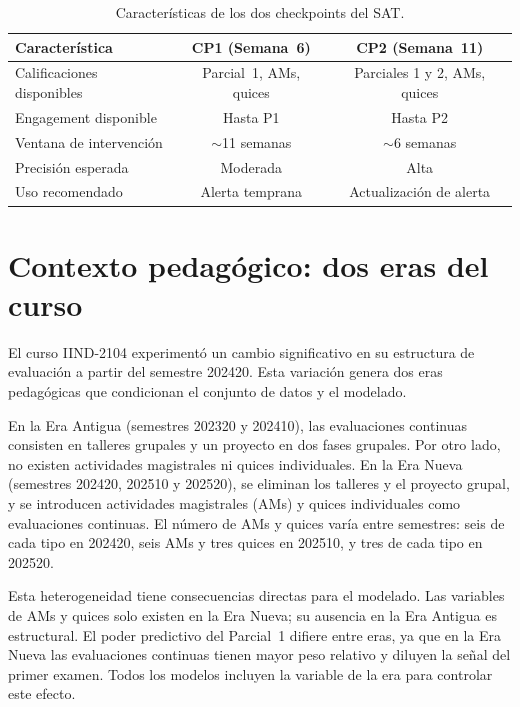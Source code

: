 \documentclass[12pt, letterpaper, openany]{report}
\begin{document}
\begin{table}[htbp]
  \centering
  \caption{Características de los dos checkpoints del SAT.}
  \label{tab:diseno_checkpoints}
  \small
  \begin{tabular}{lcc}
    \toprule
    Característica & CP1 (Semana~6) & CP2 (Semana~11) \\
    \midrule
    Calificaciones disponibles & Parcial~1, AMs, quices & Parciales 1 y 2, AMs, quices \\
    Engagement disponible      & Hasta P1  & Hasta P2 \\
    Ventana de intervención    & $\sim$11 semanas & $\sim$6 semanas \\
    Precisión esperada         & Moderada  & Alta \\
    Uso recomendado            & Alerta temprana & Actualización de alerta \\
    \bottomrule
  \end{tabular}
\end{table}

\section{Contexto pedagógico: dos eras del curso}

El curso IIND-2104 experimentó un cambio significativo en su estructura de evaluación a partir del semestre 202420. Esta variación genera dos eras pedagógicas que condicionan el conjunto de datos y el modelado.

En la Era Antigua (semestres 202320 y 202410), las evaluaciones continuas consisten en talleres grupales y un proyecto en dos fases grupales. Por otro lado, no existen actividades magistrales ni quices individuales. En la Era Nueva (semestres 202420, 202510 y 202520), se eliminan los talleres y el proyecto grupal, y se introducen actividades magistrales (AMs) y quices individuales como evaluaciones continuas. El número de AMs y quices varía entre semestres: seis de cada tipo en 202420, seis AMs y tres quices en 202510, y tres de cada tipo en 202520.

Esta heterogeneidad tiene consecuencias directas para el modelado. Las variables de AMs y quices solo existen en la Era Nueva; su ausencia en la Era Antigua es estructural. El poder predictivo del Parcial~1 difiere entre eras, ya que en la Era Nueva las evaluaciones continuas tienen mayor peso relativo y diluyen la señal del primer examen. Todos los modelos incluyen la variable de la era para controlar este efecto.
\end{document}
